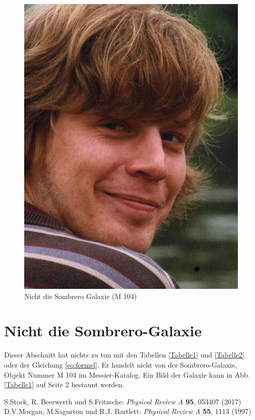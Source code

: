 \documentclass[a4paper, 10pt,onecolumn, captions=tableheading]{scrartcl}
\begin{document}
\begin{figure}
\centering
\includegraphics[scale=0.25]{tauti.jpg}
\caption{Nicht die Sombrero Galaxie (M 104)}
\end{figure}

\section{Nicht die Sombrero-Galaxie}

Dieser Abschnitt hat nichts zu tun mit den Tabellen \ref{Tabelle1} und \ref{Tabelle2} oder der Gleichung \eqref{eq:formel}. Er handelt nicht von der Sombrero-Galaxie, Objekt Nummer M 104 im Messier-Katalog. Ein Bild der Galaxie kann in Abb. \ref{Tabelle1} auf Seite 2 bestaunt werden.
\newpage

\begin{thebibliography}{2}
	 S.Stock, R. Beerwerth und S.Fritzsche: 
		\emph{Physical Review A} \textbf{95}, 053407 (2017)
	 D.V.Morgan, M.Sagurton und R.J. Bartlett: \emph{Physical Review A} \textbf{55}, 1113 (1997)
\end{thebibliography}
\end{document}

